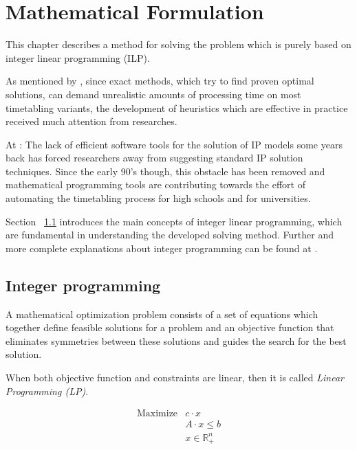 \chapter{Mathematical Formulation}
\label{chap:mipformulation}



This chapter describes a method for solving the problem which is purely based on integer linear programming (ILP).

As mentioned by \cite{Haroldo2012}, since exact methods, which try to find proven optimal solutions, can demand unrealistic amounts of processing time on most timetabling variants, the development of heuristics which are effective in practice received much attention from researches.

At \cite{Birbas2009}: The lack of efficient software tools for the solution of IP models some years back has forced researchers away from suggesting standard IP solution techniques. Since the early 90's though, this obstacle has been removed and mathematical programming tools are contributing towards the effort of automating the timetabling process for high schools and for universities.

Section ~\ref{IP} introduces the main concepts of integer linear programming, which are fundamental in understanding the developed solving method. Further and more complete explanations about integer programming can be found at \cite{Wolsey98}.


\section{Integer programming}
\label{IP}

A mathematical optimization problem consists of a set of equations which together define feasible solutions for a problem and an objective function that eliminates symmetries between these solutions and guides the search for the best solution.

When both objective function and constraints are linear, then it is called \textit{Linear Programming (LP)}.

$$
\begin{array}{rl}
   \mbox{Maximize} & c \cdot x
								\\ & A \cdot x \le b
								\\ & x \in \mathbb{R}^{n}_{+}
\end{array}
$$

